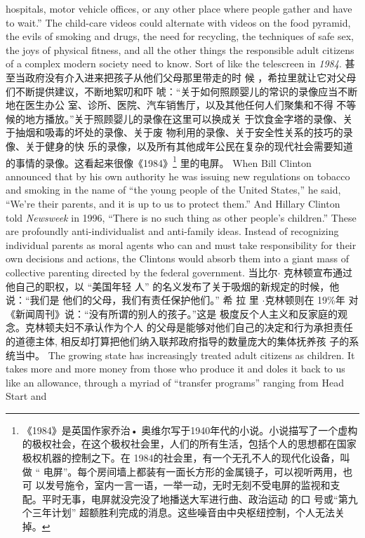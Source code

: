 \begin{paracol}{2}
hospitals, motor vehicle offices, or any other place where people
gather and have to wait.'' The child-care videos could alternate
with videos on the food pyramid, the evils of smoking and
drugs, the need for recycling, the techniques of safe sex, the joys
of physical fitness, and all the other things the responsible adult
citizens of a complex modern society need to know. Sort of like
the telescreen in \textit{1984}.
\switchcolumn
甚至当政府没有介入进来把孩子从他们父母那里带走的时
候 ，希拉里就让它对父母们不断提供建议，不断地絮叨和吓
唬：“关于如何照顾婴儿的常识的录像应当不断地在医生办公
室、诊所、医院、汽车销售厅，以及其他任何人们聚集和不得
不等候的地方播放。”关于照顾婴儿的录像在这里可以换成关
于饮食金字塔的录像、关于抽烟和吸毒的坏处的录像、关于废
物利用的录像、关于安全性关系的技巧的录像、关于健身的快
乐的录像，以及所有其他成年公民在复杂的现代社会需要知道的事情的录像。这看起来很像《1984》\footnote{《1984》是英国作家乔治• 奥维尔写于1940年代的小说。小说描写了一个虚构的极权社会，在这个极权社会里，人们的所有生活，包括个人的思想都在国家极权机器的控制之下。在 1984的社会里，有一个无孔不人的现代化设备，叫做 “ 电屏”。每个房间墙上都装有一面长方形的金属镜子，可以视听两用，也可	以发号施令，室内一言一语，一举一动，无时无刻不受电屏的监视和支配。平时无事，电屏就没完没了地播送大军进行曲、政治运动 的口 号或“第九个三年计划” 超额胜利完成的消息。这些噪音由中央枢纽控制，个人无法关掉。} 里的电屏。
\switchcolumn*
When Bill Clinton announced that by his own authority he
was issuing new regulations on tobacco and smoking in the
name of ``the young people of the United States,'' he said,
``We're their parents, and it is up to us to protect them.'' And
Hillary Clinton told \textit{Newsweek} in 1996, ``There is no such thing
as other people's children.'' These are profoundly anti-individualist and anti-family ideas. Instead of recognizing individual parents as moral agents who can and must take responsibility for
their own decisions and actions, the Clintons would absorb
them into a giant mass of collective parenting directed by the
federal government.
\switchcolumn
当比尔$\cdot$ 克林顿宣布通过他自己的职权，以 “美国年轻
人” 的名义发布了关于吸烟的新规定的时候，他说：“我们是
他们的父母，我们有责任保护他们。” 希 拉 里 $\cdot$克林顿则在
19\%年 对 《新闻周刊》说：“没有所谓的别人的孩子。”这是
极度反个人主义和反家庭的观念。克林顿夫妇不承认作为个人
的父母是能够对他们自己的决定和行为承担责任的道德主体,
相反却打算把他们纳入联邦政府指导的数量庞大的集体抚养孩
子的系统当中。
\switchcolumn*
The growing state has increasingly treated adult citizens as
children. It takes more and more money from those who produce it and doles it back to us like an allowance, through a myriad of ``transfer programs'' ranging from Head Start and

\end{paracol}
